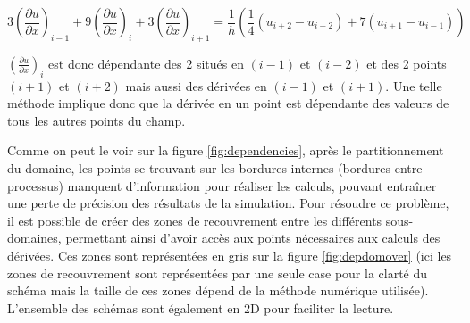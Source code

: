 \begin{equation}\label{eq:pade}
3\left( \frac{\partial u}{\partial x}\right) _{i-1} + 9\left( \frac{\partial u}{\partial x}\right) _{i} + 3\left( \frac{\partial u}{\partial x}\right) _{i+1} = \frac{1}{h}\left(  \frac{1}{4} \left( u_{i+2}-u_{i-2} \right) + 7 \left( u_{i+1} - u_{i-1} \right) \right) 
\end{equation}


$\left( \frac{\partial u}{\partial x}\right) _{i}$ est donc dépendante des 2 situés en $(i-1)$ et $(i-2)$ et des 2 points $(i+1)$ et $(i+2)$ mais aussi des dérivées en $(i-1)$ et $(i+1)$. Une telle méthode implique donc que la dérivée en un point est dépendante des valeurs de tous les autres points du champ. 


 Comme on peut le voir sur la figure \ref{fig:dependencies}, après le partitionnement du domaine, les points se trouvant sur les bordures internes (bordures entre processus) manquent d'information pour réaliser les calculs, pouvant entraîner une perte de précision des résultats de la simulation. Pour résoudre ce problème, il est possible de créer des zones de recouvrement entre les différents sous-domaines, permettant ainsi d'avoir accès aux points nécessaires aux calculs des dérivées. Ces zones sont représentées en gris sur la figure \ref{fig:depdomover} (ici les zones de recouvrement sont représentées par une seule case pour la clarté du schéma mais la taille de ces zones dépend de la méthode numérique utilisée). L'ensemble des schémas sont également en 2D pour faciliter la lecture.



